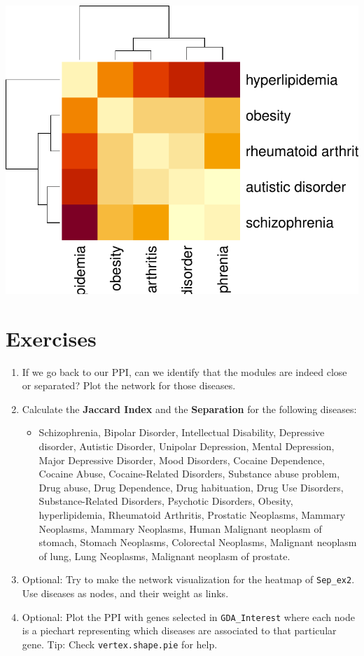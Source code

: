 \documentclass[
]{book}
\providecommand{\tightlist}{%
  \setlength{\itemsep}{0pt}\setlength{\parskip}{0pt}}
\begin{document}
\includegraphics{NetMed_files/figure-latex/unnamed-chunk-29-1.pdf}

\hypertarget{exercises-4}{%
\section{Exercises}\label{exercises-4}}

\begin{enumerate}
\def\labelenumi{\arabic{enumi}.}
\item
  If we go back to our PPI, can we identify that the modules are indeed close or separated? Plot the network for those diseases.
\item
  Calculate the \textbf{Jaccard Index} and the \textbf{Separation} for the following diseases:

  \begin{itemize}
  \tightlist
  \item
    Schizophrenia, Bipolar Disorder, Intellectual Disability, Depressive disorder, Autistic Disorder, Unipolar Depression, Mental Depression, Major Depressive Disorder, Mood Disorders, Cocaine Dependence, Cocaine Abuse, Cocaine-Related Disorders, Substance abuse problem, Drug abuse, Drug Dependence, Drug habituation, Drug Use Disorders, Substance-Related Disorders, Psychotic Disorders, Obesity, hyperlipidemia, Rheumatoid Arthritis, Prostatic Neoplasms, Mammary Neoplasms, Mammary Neoplasms, Human Malignant neoplasm of stomach, Stomach Neoplasms, Colorectal Neoplasms, Malignant neoplasm of lung, Lung Neoplasms, Malignant neoplasm of prostate.
  \end{itemize}
\item
  Optional: Try to make the network visualization for the heatmap of \texttt{Sep\_ex2}. Use diseases as nodes, and their weight as links.
\item
  Optional: Plot the PPI with genes selected in \texttt{GDA\_Interest} where each node is a piechart representing which diseases are associated to that particular gene. Tip: Check \texttt{vertex.shape.pie} for help.
\end{enumerate}
\end{document}
